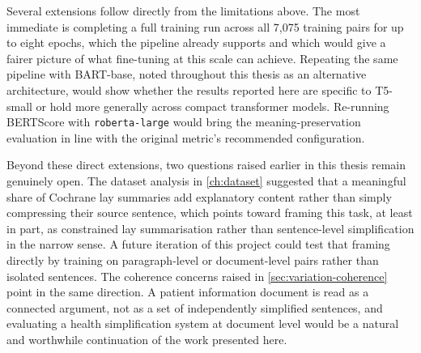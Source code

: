 Several extensions follow directly from the limitations above. The most immediate is completing a full training run across all 7{,}075 training pairs for up to eight epochs, which the pipeline already supports and which would give a fairer picture of what fine-tuning at this scale can achieve. Repeating the same pipeline with BART-base, noted throughout this thesis as an alternative architecture, would show whether the results reported here are specific to T5-small or hold more generally across compact transformer models. Re-running BERTScore with \texttt{roberta-large} would bring the meaning-preservation evaluation in line with the original metric's recommended configuration.

Beyond these direct extensions, two questions raised earlier in this thesis remain genuinely open. The dataset analysis in \cref{ch:dataset} suggested that a meaningful share of Cochrane lay summaries add explanatory content rather than simply compressing their source sentence, which points toward framing this task, at least in part, as constrained lay summarisation rather than sentence-level simplification in the narrow sense. A future iteration of this project could test that framing directly by training on paragraph-level or document-level pairs rather than isolated sentences. The coherence concerns raised in \cref{sec:variation-coherence} point in the same direction. A patient information document is read as a connected argument, not as a set of independently simplified sentences, and evaluating a health simplification system at document level would be a natural and worthwhile continuation of the work presented here.
